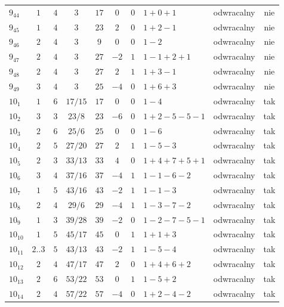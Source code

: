 \begin{longtable}{lccccccllc}
$9_{44}$   & $1$   & $4$ & $3$ & $17$  & $0$  & $0$ & $1+0+1$       & odwracalny & nie \\
$9_{45}$   & $1$   & $4$ & $3$ & $23$  & $2$  & $0$ & $1+2-1$       & odwracalny & nie \\
$9_{46}$   & $2$   & $4$ & $3$ & $9$   & $0$  & $0$ & $1-2$         & odwracalny & nie \\
$9_{47}$   & $2$   & $4$ & $3$ & $27$  & $-2$ & $1$ & $1-1+2+1$     & odwracalny & nie \\
$9_{48}$   & $2$   & $4$ & $3$ & $27$  & $2$  & $1$ & $1+3-1$       & odwracalny & nie \\
$9_{49}$   & $3$   & $4$ & $3$ & $25$  & $-4$ & $0$ & $1+6+3$       & odwracalny & nie \\
$10_{1}$   & $1$   & $6$ & $17/15$ & $17$  & $0$  & $0$ & $1-4$         & odwracalny & tak \\
$10_{2}$   & $3$   & $3$ & $23/8$ & $23$  & $-6$ & $0$ & $1+2-5-5-1$   & odwracalny & tak \\
$10_{3}$   & $2$   & $6$ & $25/6$ & $25$  & $0$  & $0$ & $1-6$         & odwracalny & tak \\
$10_{4}$   & $2$   & $5$ & $27/20$ & $27$  & $2$  & $1$ & $1-5-3$       & odwracalny & tak \\
$10_{5}$   & $2$   & $3$ & $33/13$ & $33$  & $4$  & $0$ & $1+4+7+5+1$   & odwracalny & tak \\
$10_{6}$   & $3$   & $4$ & $37/16$ & $37$  & $-4$ & $1$ & $1-1-6-2$     & odwracalny & tak \\
$10_{7}$   & $1$   & $5$ & $43/16$ & $43$  & $-2$ & $1$ & $1-1-3$       & odwracalny & tak \\
$10_{8}$   & $2$   & $4$ & $29/6$ & $29$  & $-4$ & $1$ & $1-3-7-2$     & odwracalny & tak \\
$10_{9}$   & $1$   & $3$ & $39/28$ & $39$  & $-2$ & $0$ & $1-2-7-5-1$   & odwracalny & tak \\
$10_{10}$  & $1$   & $5$ & $45/17$ & $45$  & $0$  & $1$ & $1+1+3$       & odwracalny & tak \\
$10_{11}$  & $2..3$ & $5$ & $43/13$ & $43$  & $-2$ & $1$ & $1-5-4$       & odwracalny & tak \\
$10_{12}$  & $2$   & $4$ & $47/17$ & $47$  & $2$  & $0$ & $1+4+6+2$     & odwracalny & tak \\
$10_{13}$  & $2$   & $6$ & $53/22$ & $53$  & $0$  & $1$ & $1-5+2$       & odwracalny & tak \\
$10_{14}$  & $2$   & $4$ & $57/22$ & $57$  & $-4$ & $0$ & $1+2-4-2$     & odwracalny & tak \\

\end{longtable}
